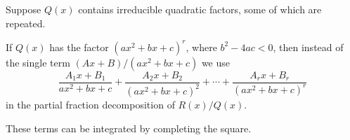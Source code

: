 \begin{frame}
Suppose $Q(x)$ contains irreducible quadratic factors, some of which are repeated.

If $Q(x)$ has the factor $(ax^2 + bx+c)^r$, where $b^2-4ac < 0$, then instead of the single term $(Ax+B)/(ax^2+bx+c)$ we use  
\[
\frac{A_1x+B_1}{ax^2+bx+c} + %
\frac{A_2x+B_2}{(ax^2+bx+c)^2} + %
 \cdots + %
\frac{A_rx+B_r}{(ax^2+bx+c)^r} %
\]
in the partial fraction decomposition of $R(x)/Q(x)$.

These terms can be integrated by completing the square.
\end{frame}
